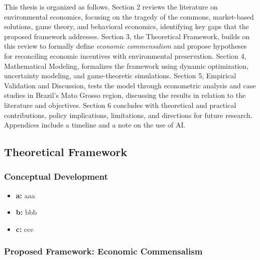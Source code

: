 This thesis is organized as follows. Section 2 reviews the literature on environmental economics, focusing on the tragedy of the commons, market-based solutions, game theory, and behavioral economics, identifying key gaps that the proposed framework addresses. Section 3, the Theoretical Framework, builds on this review to formally define \textit{economic commensalism} and propose hypotheses for reconciling economic incentives with environmental preservation. Section 4, Mathematical Modeling, formalizes the framework using dynamic optimization, uncertainty modeling, and game-theoretic simulations. Section 5, Empirical Validation and Discussion, tests the model through econometric analysis and case studies in Brazil's Mato Grosso region, discussing the results in relation to the literature and objectives. Section 6 concludes with theoretical and practical contributions, policy implications, limitations, and directions for future research. Appendices include a timeline and a note on the use of AI.

\subsection{Theoretical Framework}

\subsubsection{Conceptual Development}
\begin{itemize}
    \item \textbf{a:} aaa
    \item \textbf{b:} bbb
    \item \textbf{c:} ccc
\end{itemize}

\subsubsection{Proposed Framework: Economic Commensalism}

